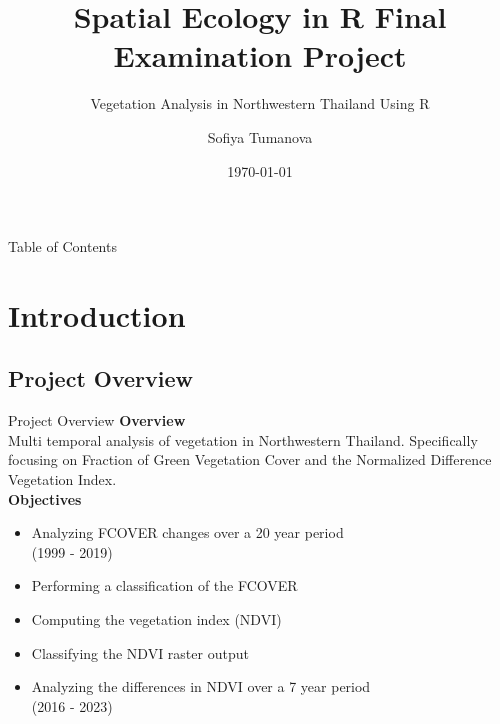 \documentclass[8pt]{beamer}
\title{Spatial Ecology in R Final Examination Project}
\subtitle{Vegetation Analysis in Northwestern Thailand Using R}
\institute{University of Bologna}
\author{Sofiya Tumanova}
\date{\today}
\begin{document}
\begin{frame}
    \titlepage
\end{frame}

\begin{frame}{Table of Contents}
    \tableofcontents
\end{frame}

\section{Introduction}
\subsection{Project Overview}
\begin{frame}{Project Overview}
    \textbf{Overview}\\
    Multi temporal analysis of vegetation in Northwestern Thailand. Specifically focusing on Fraction of Green Vegetation Cover and the Normalized Difference Vegetation Index.\\ 
    \smallskip
    \textbf{Objectives}
    \begin{itemize}
        \item Analyzing FCOVER changes over a 20 year period\\
        (1999 - 2019)
        \item Performing a classification of the FCOVER
        \item Computing the vegetation index (NDVI)
        \item Classifying the NDVI raster output
        \item Analyzing the differences in NDVI over a 7 year period\\
        (2016 - 2023)
    \end{itemize}    
\end{frame}
\end{document}
